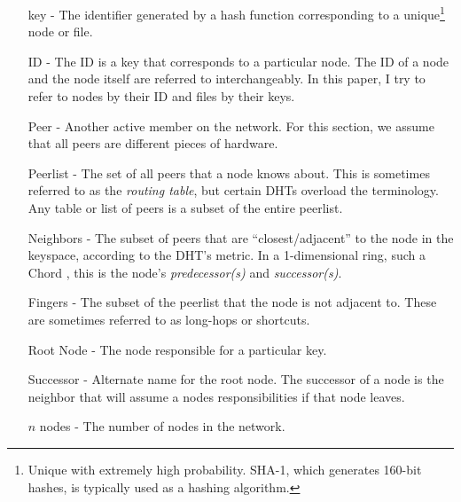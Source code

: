 \documentclass[10pt,letterpaper,twoside]{report}
\begin{document}
\begin{enumerate}
    \item[key] -  The identifier generated by a hash function corresponding to a unique\footnote{Unique with extremely high probability. SHA-1, which generates 160-bit hashes, is typically used as a hashing algorithm.} node or file.
    \item[ID] - The ID is a key that corresponds to a particular node.  
    The ID of a node and the node itself are referred to interchangeably.
    In this paper, I try to refer to nodes by their ID and files by their keys.
	\item[Peer]  - Another active member on the network.  
    For this section, we assume that all peers are different pieces of hardware.
	\item[Peerlist] -  The set of all peers that a node knows about.  
    This is sometimes referred to as the \textit{routing table}, but certain DHTs \cite{tapestry} \cite{pastry} overload the terminology.
    Any table or list of peers is a subset of the entire peerlist.
	\item[Neighbors] - The subset of peers that are ``closest/adjacent'' to the node in the keyspace, according to the DHT's metric.  In a 1-dimensional ring, such a Chord \cite{chord}, this is the node's \textit{predecessor(s)} and \textit{successor(s)}.
	\item[Fingers] - The subset of the peerlist that the node is not adjacent to.  
    These are sometimes referred to as long-hops or shortcuts.
	\item[Root Node] - The node responsible for a particular key. 
	\item[Successor] -  Alternate name for the root node. 
	The successor of a node is the neighbor that will assume a nodes responsibilities if that node leaves. 
    \item[$n$ nodes] -  The number of nodes in the network.
    
\end{enumerate}
\end{document}
